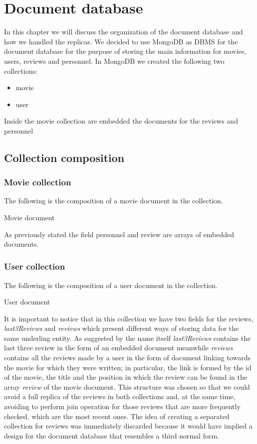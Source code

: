%
%
\chapter{Document database}
\justifying
In this chapter we will discuss the organization of the document database and how we handled the replicas. We decided to use MongoDB as DBMS for the document database for the purpose of storing the main information for movies, users, reviews and personnel. In MongoDB we created the following two collections: 
\begin{itemize}
	\item movie
	\item user
\end{itemize}
Inside the movie collection are embedded the documents for the reviews and personnel
\section{Collection composition}
\subsection{Movie collection}
The following is the composition of a movie document in the collection.

\caption{Movie document}

As previously stated the field personnel and review are arrays of embedded documents.

\paragraph{}
\subsection{User collection}
The following is the composition of a user document in the collection.

\caption{User document}

It is important to notice that in this collection we have two fields for the reviews, \emph{last3Reviews} and \emph{reviews} which present different ways of storing data for the same underling entity. As suggested by the name itself \emph{last3Reviews} contains the last three review in the form of an embedded document meanwhile \emph{reviews} contains all the reviews made by a user in the form of document linking towards the movie for which they were written; in particular, the link is formed by the id of the movie, the title and the position in which the review can be found in the array \emph{review} of the movie document. This structure was chosen so that we could avoid a full replica of the reviews in both collections and, at the same time, avoiding to perform join operation for those reviews that are more frequently checked, which are the most recent ones. The idea of creating a separated collection for reviews was immediately discarded because it would have implied a design for the document database that resembles a third normal form.

